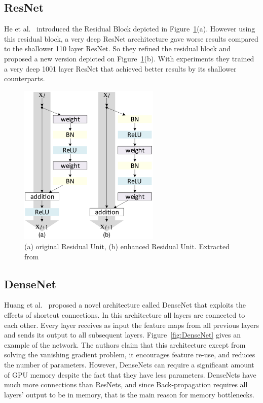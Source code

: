 \subsection{ResNet}
He et al.~\cite{he2016deep} introduced the Residual Block depicted in Figure~\ref{fig:ResNet}(a). However using this residual block, a very deep ResNet arcchitecture gave worse results compared to the shallower 110 layer ResNet. So they refined the residual block and proposed a new version depicted on Figure~\ref{fig:ResNet}(b). With experiments they trained a very deep 1001 layer ResNet that achieved better results by its shallower counterparts.

\begin{figure}[]
    \begin{center}
    \includegraphics[width=0.6\textwidth]{images/ResNet.png}
    \end{center}
    \caption{(a) original Residual Unit, (b) enhanced Residual Unit. Extracted from~\cite{he2016identity}}\label{fig:ResNet}
\end{figure}

\subsection{DenseNet}
Huang et al.~\cite{huang2017densely} proposed a novel architecture called DenseNet that exploits the effects of shortcut connections. In this architecture all layers are connected to each other. Every layer receives as input the feature maps from all previous layers and sends its output to all subsequent layers. Figure~\ref{fig:DenseNet} gives an example of the network. The authors claim that this architecture except from solving the vanishing gradient problem, it encourages feature re-use, and reduces the number of parameters. However, DenseNets can require a significant amount of GPU memory despite the fact that they have less parameters. DenseNets have much more connections than ResNets, and since Back-propagation requires all layers' output to be in memory, that is the main reason for memory bottlenecks. 

